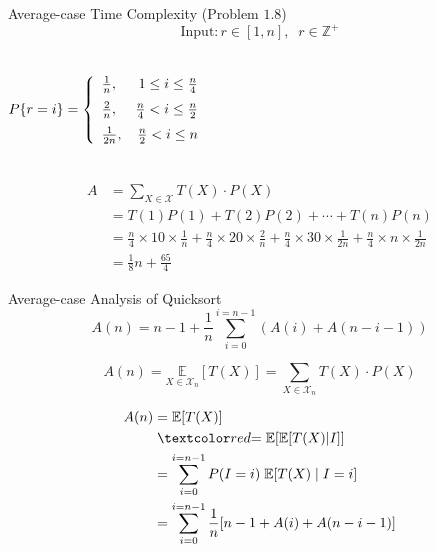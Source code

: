 \begin{frame}{}
  \begin{exampleblock}{Average-case Time Complexity (Problem $1.8$)}
    \[
      \text{Input}: r \in [1,n], \;\; r \in \mathbb{Z}^{+}
    \]

    \begin{columns}
	\[
	  P\{r = i\} = \left\{\begin{array}{lr}
	    \frac{1}{n}, & 1 \le i \le \frac{n}{4} \\[6pt]
	    \frac{2}{n}, & \frac{n}{4} < i \le \frac{n}{2} \\[6pt]
	    \frac{1}{2n}, & \frac{n}{2} < i \le n
	  \end{array}\right.
	\]
    \end{columns}
  \end{exampleblock}

  \pause
  \begin{align*}
    A &= \sum_{X \in \mathcal{X}} T(X) \cdot P(X) \\
      &= T(1) P(1) + T(2) P(2) + \cdots + T(n) P(n) \\
      &= \frac{n}{4} \times 10 \times \frac{1}{n} + \frac{n}{4} \times 20 \times \frac{2}{n} + 
         \frac{n}{4} \times 30 \times \frac{1}{2n} + \frac{n}{4} \times n \times \frac{1}{2n} \\
      &= \frac{1}{8} n + \frac{65}{4}
  \end{align*}
\end{frame}
\begin{frame}{Average-case Analysis of Quicksort}
  \[
    A(n) = n-1 + \frac{1}{n} \sum_{i=0}^{i=n-1} (A(i) + A(n-i-1))
  \]

  \[
    A(n) = \underset{X \in \mathcal{X}_{n}}{\mathbb{E}} [T(X)] = \sum_{X \in \mathcal{X}_{n}} T(X) \cdot P(X)
  \]

  \pause
  \begin{align*}
    A(n) &= \mathbb{E}[T(X)] \\
	 &\;\red{= \mathbb{E}[\mathbb{E}[T(X)|I]]} \\
	 &= \sum_{i=0}^{i=n-1} P(I = i)\; \mathbb{E}[T(X) \mid I = i] \\
	 &= \sum_{i=0}^{i=n-1} \frac{1}{n} [n-1 + A(i) + A(n-i-1)]
  \end{align*}
\end{frame}
